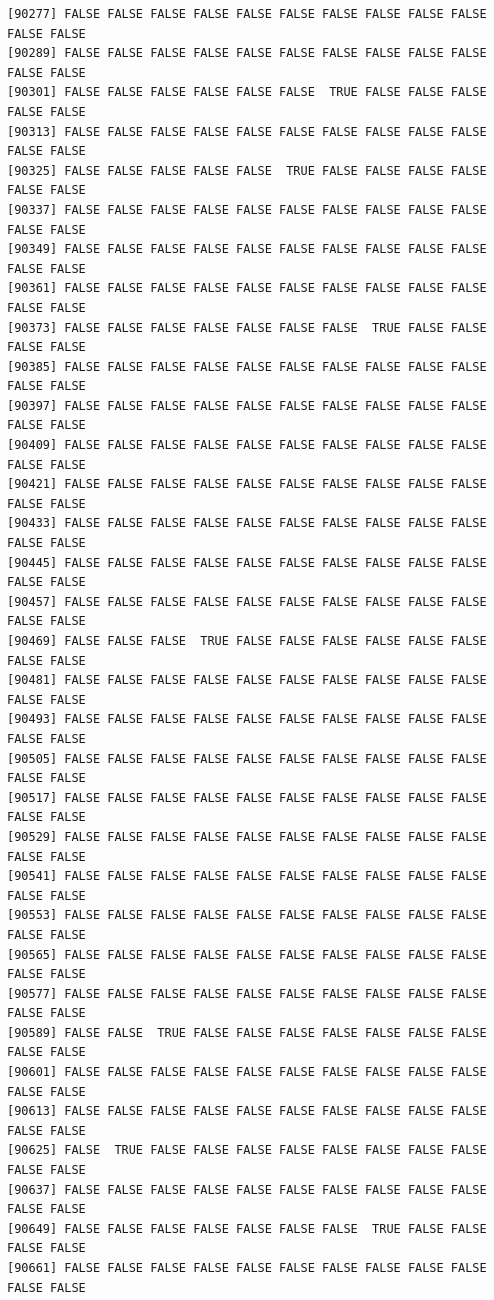 \documentclass[
  a4paper,
  DIV=11,
  numbers=noendperiod]{scrartcl}
\begin{document}
\begin{verbatim}
[90277] FALSE FALSE FALSE FALSE FALSE FALSE FALSE FALSE FALSE FALSE FALSE FALSE
[90289] FALSE FALSE FALSE FALSE FALSE FALSE FALSE FALSE FALSE FALSE FALSE FALSE
[90301] FALSE FALSE FALSE FALSE FALSE FALSE  TRUE FALSE FALSE FALSE FALSE FALSE
[90313] FALSE FALSE FALSE FALSE FALSE FALSE FALSE FALSE FALSE FALSE FALSE FALSE
[90325] FALSE FALSE FALSE FALSE FALSE  TRUE FALSE FALSE FALSE FALSE FALSE FALSE
[90337] FALSE FALSE FALSE FALSE FALSE FALSE FALSE FALSE FALSE FALSE FALSE FALSE
[90349] FALSE FALSE FALSE FALSE FALSE FALSE FALSE FALSE FALSE FALSE FALSE FALSE
[90361] FALSE FALSE FALSE FALSE FALSE FALSE FALSE FALSE FALSE FALSE FALSE FALSE
[90373] FALSE FALSE FALSE FALSE FALSE FALSE FALSE  TRUE FALSE FALSE FALSE FALSE
[90385] FALSE FALSE FALSE FALSE FALSE FALSE FALSE FALSE FALSE FALSE FALSE FALSE
[90397] FALSE FALSE FALSE FALSE FALSE FALSE FALSE FALSE FALSE FALSE FALSE FALSE
[90409] FALSE FALSE FALSE FALSE FALSE FALSE FALSE FALSE FALSE FALSE FALSE FALSE
[90421] FALSE FALSE FALSE FALSE FALSE FALSE FALSE FALSE FALSE FALSE FALSE FALSE
[90433] FALSE FALSE FALSE FALSE FALSE FALSE FALSE FALSE FALSE FALSE FALSE FALSE
[90445] FALSE FALSE FALSE FALSE FALSE FALSE FALSE FALSE FALSE FALSE FALSE FALSE
[90457] FALSE FALSE FALSE FALSE FALSE FALSE FALSE FALSE FALSE FALSE FALSE FALSE
[90469] FALSE FALSE FALSE  TRUE FALSE FALSE FALSE FALSE FALSE FALSE FALSE FALSE
[90481] FALSE FALSE FALSE FALSE FALSE FALSE FALSE FALSE FALSE FALSE FALSE FALSE
[90493] FALSE FALSE FALSE FALSE FALSE FALSE FALSE FALSE FALSE FALSE FALSE FALSE
[90505] FALSE FALSE FALSE FALSE FALSE FALSE FALSE FALSE FALSE FALSE FALSE FALSE
[90517] FALSE FALSE FALSE FALSE FALSE FALSE FALSE FALSE FALSE FALSE FALSE FALSE
[90529] FALSE FALSE FALSE FALSE FALSE FALSE FALSE FALSE FALSE FALSE FALSE FALSE
[90541] FALSE FALSE FALSE FALSE FALSE FALSE FALSE FALSE FALSE FALSE FALSE FALSE
[90553] FALSE FALSE FALSE FALSE FALSE FALSE FALSE FALSE FALSE FALSE FALSE FALSE
[90565] FALSE FALSE FALSE FALSE FALSE FALSE FALSE FALSE FALSE FALSE FALSE FALSE
[90577] FALSE FALSE FALSE FALSE FALSE FALSE FALSE FALSE FALSE FALSE FALSE FALSE
[90589] FALSE FALSE  TRUE FALSE FALSE FALSE FALSE FALSE FALSE FALSE FALSE FALSE
[90601] FALSE FALSE FALSE FALSE FALSE FALSE FALSE FALSE FALSE FALSE FALSE FALSE
[90613] FALSE FALSE FALSE FALSE FALSE FALSE FALSE FALSE FALSE FALSE FALSE FALSE
[90625] FALSE  TRUE FALSE FALSE FALSE FALSE FALSE FALSE FALSE FALSE FALSE FALSE
[90637] FALSE FALSE FALSE FALSE FALSE FALSE FALSE FALSE FALSE FALSE FALSE FALSE
[90649] FALSE FALSE FALSE FALSE FALSE FALSE FALSE  TRUE FALSE FALSE FALSE FALSE
[90661] FALSE FALSE FALSE FALSE FALSE FALSE FALSE FALSE FALSE FALSE FALSE FALSE

\end{verbatim}
\end{document}

